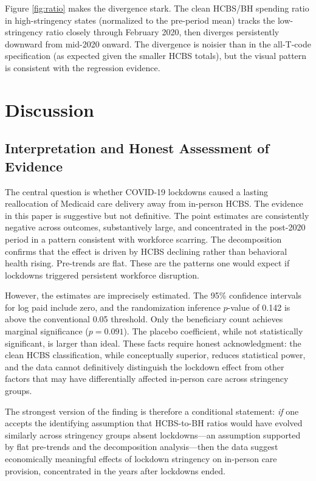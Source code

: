 \documentclass[12pt]{article}
\begin{document}
Figure \ref{fig:ratio} makes the divergence stark. The clean HCBS/BH spending ratio in high-stringency states (normalized to the pre-period mean) tracks the low-stringency ratio closely through February 2020, then diverges persistently downward from mid-2020 onward. The divergence is noisier than in the all-T-code specification (as expected given the smaller HCBS totals), but the visual pattern is consistent with the regression evidence.


\section{Discussion}

\subsection{Interpretation and Honest Assessment of Evidence}

The central question is whether COVID-19 lockdowns caused a lasting reallocation of Medicaid care delivery away from in-person HCBS. The evidence in this paper is suggestive but not definitive. The point estimates are consistently negative across outcomes, substantively large, and concentrated in the post-2020 period in a pattern consistent with workforce scarring. The decomposition confirms that the effect is driven by HCBS declining rather than behavioral health rising. Pre-trends are flat. These are the patterns one would expect if lockdowns triggered persistent workforce disruption.

However, the estimates are imprecisely estimated. The 95\% confidence intervals for log paid include zero, and the randomization inference $p$-value of 0.142 is above the conventional 0.05 threshold. Only the beneficiary count achieves marginal significance ($p = 0.091$). The placebo coefficient, while not statistically significant, is larger than ideal. These facts require honest acknowledgment: the clean HCBS classification, while conceptually superior, reduces statistical power, and the data cannot definitively distinguish the lockdown effect from other factors that may have differentially affected in-person care across stringency groups.

The strongest version of the finding is therefore a conditional statement: \textit{if} one accepts the identifying assumption that HCBS-to-BH ratios would have evolved similarly across stringency groups absent lockdowns---an assumption supported by flat pre-trends and the decomposition analysis---then the data suggest economically meaningful effects of lockdown stringency on in-person care provision, concentrated in the years after lockdowns ended.
\end{document}
